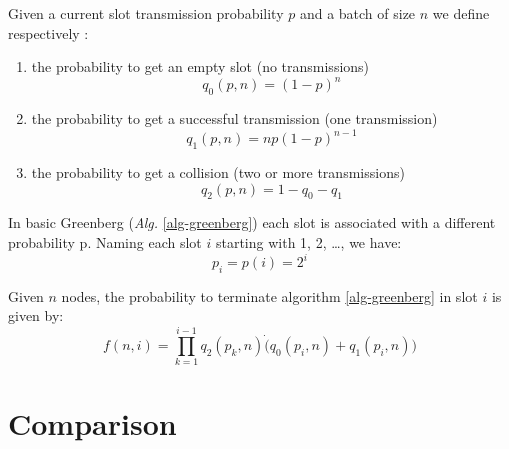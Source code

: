 \documentclass[12pt,a4paper,twocolumns]{report}
\begin{document}
Given a current slot transmission probability $p$ and a batch of size $n$ we define respectively :
\begin{enumerate}
\item the probability to get an empty slot (no transmissions)
\begin{equation}q_{0}(p,n)=(1-p)^{n}\end{equation} 
\item the probability to get a successful transmission (one transmission)
\begin{equation}q_{1}(p,n)=n p (1-p)^{n-1} \end{equation} 
\item the probability to get a collision (two or more transmissions)
\begin{equation}q_{2}(p,n)=1-q_{0}-q_{1}\end{equation}
\end{enumerate}

In basic Greenberg (\emph{Alg.} \ref{alg-greenberg}) each slot is associated with a different probability p. Naming each slot $i$ starting with 1, 2, \dots, we have:
\begin{equation}
	p_{i}=p(i)=2^{i}
\end{equation}

Given $n$ nodes, the probability to terminate algorithm \ref{alg-greenberg} in slot $i$ is given by:
\begin{equation}
f(n,i)=\prod_{k=1}^{i-1}q_{2}(p_{k},n) \dot (q_{0}(p_{i},n)+q_{1}(p_{i},n))  
\label{eq:bgstopprobability}
\end{equation}


\chapter{Comparison}
\end{document}
